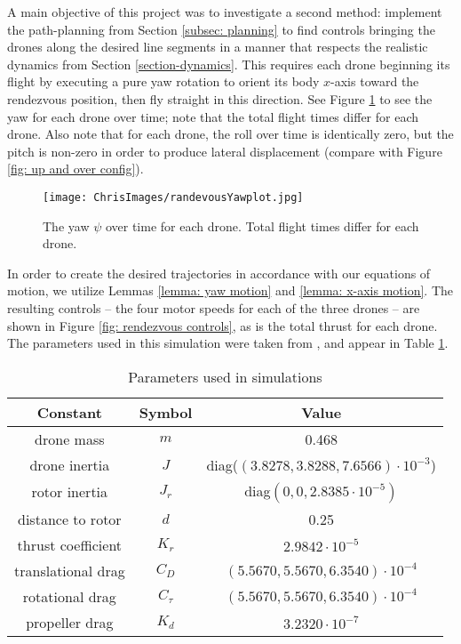 \documentclass{aims}
\theoremstyle{definition}
\begin{document}
A main objective of this project was to investigate a second method: implement the path-planning from Section \ref{subsec: planning} to find controls bringing the drones along the desired line segments in a manner that respects the realistic dynamics from Section \ref{section-dynamics}.  This requires each drone beginning its flight by executing a pure yaw rotation to orient its body $x$-axis toward the rendezvous position, then fly straight in this direction.  See Figure \ref{fig: rendezvous yaw} to see the yaw for each drone over time; note that the total flight times differ for each drone.  Also note that for each drone, the roll over time is identically zero, but the pitch is non-zero in order to produce lateral displacement (compare with Figure \ref{fig: up and over config}).

\begin{figure}
    \centering
    \texttt{[image: ChrisImages/randevousYawplot.jpg]}
    \caption{The yaw $\psi$ over time for each drone.  Total flight times differ for each drone.}
    \label{fig: rendezvous yaw}
\end{figure}

In order to create the desired trajectories in accordance with our equations of motion, we utilize Lemmas \ref{lemma: yaw motion} and \ref{lemma: x-axis motion}.  The resulting controls -- the four motor speeds for each of the three drones -- are shown in Figure \ref{fig: rendezvous controls}, as is the total thrust for each drone.  The parameters used in this simulation were taken from \cite{Bouadi2}, and appear in Table \ref{tab:params}.

\begin{table}
\caption{Parameters used in simulations}
\def\arraystretch{1.2}
  \begin{tabular}{ |  c | c |c |}
    \hline
    Constant & Symbol & Value \\ \hline 
    drone mass & $m$ & 0.468 \\ \hline 
    drone inertia  & $J$  & diag($(3.8278,3.8288,7.6566)\cdot10^{-3}$) \\ \hline 
   rotor inertia & $J_r$  & diag$(0, 0,2.8385\cdot 10^{-5})$  \\ \hline
       distance to rotor  & $d$  & 0.25  \\ \hline 
   thrust coefficient & $K_r$  & $2.9842\cdot 10^{-5}$ \\ \hline 
     translational drag & $C_D$ & $(5.5670,5.5670,6.3540)\cdot10^{-4}$  \\ \hline 
   rotational drag & $C_{\tau}$ & $(5.5670,5.5670,6.3540)\cdot 10^{-4}$  \\ \hline 
   propeller drag & $K_d$ & $3.2320\cdot 10^{-7}$ \\ \hline 
  \end{tabular}
  \label{tab:params}
\end{table}
 
\end{document}
